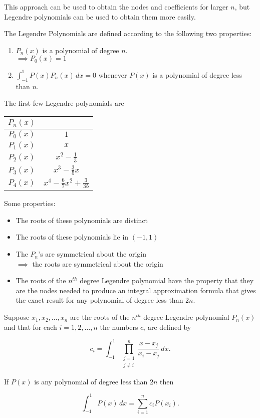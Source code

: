 This approach can be used to obtain the nodes and coefficients for larger $n$,
but Legendre polynomials can be used to obtain them more easily.

The Legendre Polynomials are defined according to the following two properties:

\begin{enumerate}
\item $P_n(x)$ is a polynomial of degree $n$.\\
  $\implies P_0(x) = 1$ 
\item $\int_{-1}^{1} P(x)P_n(x) \, dx = 0$ whenever $P(x)$ is a polynomial of
  degree less than $n$.
\end{enumerate}

The first few Legendre polynomials are

\renewcommand{\arraystretch}{1.25}
\begin{center}
  \begin{tabular}{c|c}
    $P_n(x)$ & \\ \hline
    $P_0(x)$ & $1$ \\
    $P_1(x)$ & $x$ \\
    $P_2(x)$ & $x^2-\frac{1}{3}$ \\
    $P_3(x)$ & $x^3-\frac{3}{5}x$ \\
    $P_4(x)$ & $x^4-\frac{6}{7}x^2+\frac{3}{35}$ \\
  \end{tabular}
\end{center}

Some properties:

\begin{itemize}
\item The roots of these polynomials are distinct
\item The roots of these polynomials lie in $(-1, 1)$
\item The $P_n$'s are symmetrical about the origin\\
  $\implies$ the roots are symmetrical about the origin
\item The roots of the $n^{th}$ degree Legendre polynomial have the property
  that they are the nodes needed to produce an integral approximation formula
  that gives the exact result for any polynomial of degree less than $2n$.
\end{itemize}

\thm Suppose $x_1, x_2, \dots, x_n$ are the roots of the $n^{th}$ degree
Legendre polynomial $P_n(x)$ and that for each $i=1, 2, \dots, n$ the numbers
$c_i$ are defined by

\begin{equation*}
  c_i = \int_{-1}^{1} \prod_{\substack{j = 1 \\ j \ne i}}^{n} \frac{x-x_j}{x_i-x_j} \, dx
.\end{equation*}

If $P(x)$ is any polynomial of degree less than $2n$ then

\begin{equation*}
  \int_{-1}^{1} P(x) \, dx = \sum_{i=1}^{n} c_i P(x_i)
.\end{equation*}

